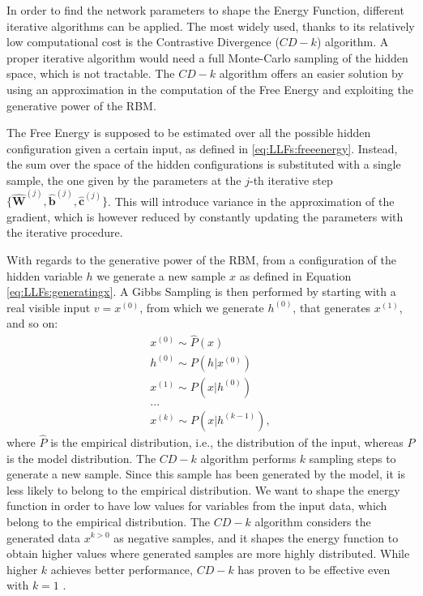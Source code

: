 In order to find the network parameters to shape the Energy Function, different iterative algorithms can be applied. The most widely used, thanks to its relatively low computational cost is the Contrastive Divergence ($CD-k$) algorithm. A proper iterative algorithm would need a full Monte-Carlo sampling of the hidden space, which is not tractable. The $CD-k$ algorithm offers an easier solution by using an approximation in the computation of the Free Energy and exploiting the generative power of the RBM. 

The Free Energy is supposed to be estimated over all the possible hidden configuration given a certain input, as defined in \ref{eq:LLFs:freeenergy}. Instead, the sum over the space of the hidden configurations is substituted with a single sample, the one given by the parameters at the $j$-th iterative step  $\{\hat{\mathbf{W}}^{(j)}, \hat{\mathbf{b}}^{(j)}, \hat{\mathbf{c}}^{(j)} \}$. This will introduce variance in the approximation of the gradient, which is however reduced by constantly updating the parameters with the iterative procedure.

With regards to the generative power of the RBM, from a configuration of the hidden variable $h$ we generate a new sample $x$ as defined in Equation \ref{eq:LLFs:generatingx}. A Gibbs Sampling is then performed by starting with a real visible input $v=x^{(0)}$, from which we generate $h^{(0)}$, that generates $x^{(1)}$, and so on:
\begin{align*}
x^{(0)} \sim \hat{P}(x)\\
h^{(0)} \sim P(h|x^{(0)})\\
x^{(1)} \sim P(x|h^{(0)})\\
...\\
x^{(k)} \sim P(x|h^{(k-1)}),
\end{align*}
where  $\hat{P}$ is the empirical distribution, i.e., the distribution of the input, whereas $P$ is the model distribution.
The $CD-k$ algorithm performs $k$ sampling steps to generate a new sample. Since this sample has been generated by the model, it is less likely to belong to the empirical distribution. We want to shape the energy function in order to have low values for variables from the input data, which belong to the empirical distribution. The $CD-k$ algorithm considers the generated data $x^{k>0}$ as negative samples, and it shapes the energy function to obtain higher values where generated samples are more highly distributed. While higher $k$ achieves better performance, $CD-k$ has proven to be effective even with $k=1$ \cite{Bengio2009}.

